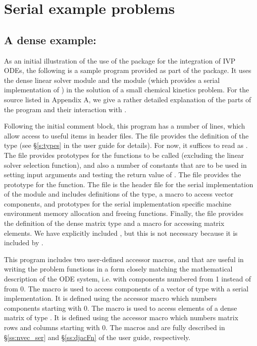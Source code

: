 \section{Serial example problems}\label{s:ex_serial}

\subsection{A dense example: }\label{ss:cvdx}

As an initial illustration of the use of the {\cvode} package for the
integration of IVP ODEs, the following is a sample program provided as part 
of the package.  It uses the {\cvode} dense linear solver module {\cvdense} 
and the {\nvecs} module (which provides a serial implementation of {\nvector})
in the solution of a small chemical kinetics problem.
For the source listed in Appendix A, we give a rather detailed explanation
of the parts of the program and their interaction with {\cvode}.

Following the initial comment block, this program has a number
of  lines, which allow access to useful items in {\cvode}
header files.  The  file provides the definition of the
type  (see \S\ref{s:types} in the user guide for
details).  For now, it suffices to read  as .
The  file provides prototypes for the {\cvode}
functions to be called (excluding the linear solver selection
function), and also a number of constants that are to be used in
setting input arguments and testing the return value of .
The  file provides the prototype for the  function.
The  file is the header file for the serial
implementation of the {\nvector} module and includes definitions of the 
 type, a macro to access vector components, and prototypes 
for the serial implementation specific machine environment memory allocation
and freeing functions.
Finally, the  file provides the definition of the dense
matrix type  and a macro for accessing matrix elements.
We have explicitly included , but this is not necessary because 
it is included by .

This program includes two user-defined accessor macros,  and
 that are useful in writing the problem functions in a form
closely matching the mathematical description of the ODE system,
i.e. with components numbered from 1 instead of from 0.  The 
macro is used to access components of a vector of type 
with a serial implementation.  It is defined using the {\nvecs}
accessor macro  which numbers components starting with
0. The  macro is used to access elements of a dense matrix of
type . It is defined using the {\dense} accessor macro
 which numbers matrix rows and columns starting with
0. The macros  and  are fully described
in \S\ref{ss:nvec_ser} and \S\ref{ss:djacFn} of the user guide,
respectively.

